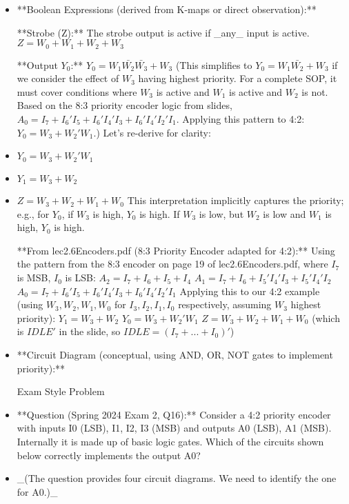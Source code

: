 \documentclass{article}
\begin{document}
\begin{itemize}
    \item **Boolean Expressions (derived from K-maps or direct observation):**

         **Strobe (Z):** The strobe output is active if \_any\_ input is active. $Z = W_0 + W_1 + W_2 + W_3$

         **Output $Y_0$:** $Y_0 = W_1\bar{W_2}\bar{W_3} + W_3$ (This simplifies to $Y_0 = W_1\bar{W_2} + W_3$ if we consider the effect of $W_3$ having highest priority. For a complete SOP, it must cover conditions where $W_3$ is active and $W_1$ is active and $W_2$ is not. Based on the 8:3 priority encoder logic from slides, $A_0 = I_7 + I_6'I_5 + I_6'I_4'I_3 + I_6'I_4'I_2'I_1$. Applying this pattern to 4:2: $Y_0 = W_3 + W_2'W_1$.) Let's re-derive for clarity:

            \item $Y_0 = W_3 + W_2'W_1$

            \item $Y_1 = W_3 + W_2$

            \item $Z = W_3 + W_2 + W_1 + W_0$ This interpretation implicitly captures the priority; e.g., for $Y_0$, if $W_3$ is high, $Y_0$ is high. If $W_3$ is low, but $W_2$ is low and $W_1$ is high, $Y_0$ is high.

         **From lec2.6Encoders.pdf (8:3 Priority Encoder adapted for 4:2):** Using the pattern from the 8:3 encoder on page 19 of lec2.6Encoders.pdf, where $I_7$ is MSB, $I_0$ is LSB: $A_2 = I_7 + I_6 + I_5 + I_4$ $A_1 = I_7 + I_6 + I_5'I_4'I_3 + I_5'I_4'I_2$ $A_0 = I_7 + I_6'I_5 + I_6'I_4'I_3 + I_6'I_4'I_2'I_1$ Applying this to our 4:2 example (using $W_3, W_2, W_1, W_0$ for $I_3, I_2, I_1, I_0$ respectively, assuming $W_3$ highest priority): $Y_1 = W_3 + W_2$ $Y_0 = W_3 + W_2'W_1$ $Z = W_3 + W_2 + W_1 + W_0$ (which is $IDLE'$ in the slide, so $IDLE = (I_7+...+I_0)'$)

    \item **Circuit Diagram (conceptual, using AND, OR, NOT gates to implement priority):** 

Exam Style Problem

\item **Question (Spring 2024 Exam 2, Q16):** Consider a 4:2 priority encoder with inputs I0 (LSB), I1, I2, I3 (MSB) and outputs A0 (LSB), A1 (MSB). Internally it is made up of basic logic gates. Which of the circuits shown below correctly implements the output A0?

\item \_(The question provides four circuit diagrams. We need to identify the one for A0.)\_


\end{itemize}
\end{document}
